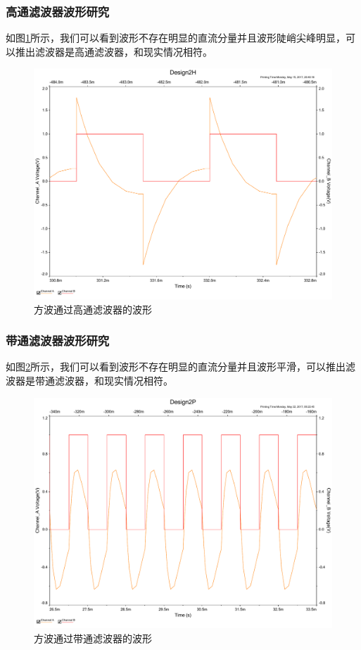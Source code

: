 \documentclass[UTF8,a4paper]{paper}
\begin{document}
\begin{multicols}{2}
\subsubsection{高通滤波器波形研究}
如图\ref{BIH}所示，我们可以看到波形不存在明显的直流分量并且波形陡峭尖峰明显，可以推出滤波器是高通滤波器，和现实情况相符。
\begin{figure}[H]
\centering
\includegraphics[width=\columnwidth]{2H.pdf}
\caption{方波通过高通滤波器的波形}
\label{BIH}
\end{figure}
\subsubsection{带通滤波器波形研究}
如图\ref{BIP}所示，我们可以看到波形不存在明显的直流分量并且波形平滑，可以推出滤波器是带通滤波器，和现实情况相符。
\begin{figure}[H]
\centering
\includegraphics[width=\columnwidth]{2P.pdf}
\caption{方波通过带通滤波器的波形}
\label{BIP}
\end{figure}

\end{multicols}
\end{document}
